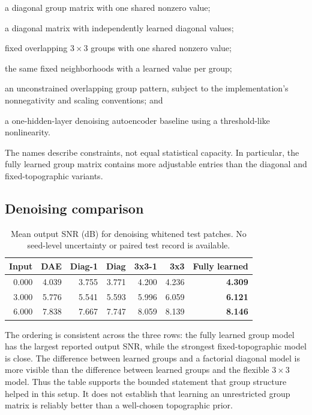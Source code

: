 \begin{description}[style=nextline]
  \item[Diag-1] a diagonal group matrix with one shared nonzero value;
  \item[Diag] a diagonal matrix with independently learned diagonal values;
  \item[3x3-1] fixed overlapping $3\times3$ groups with one shared nonzero value;
  \item[3x3] the same fixed neighborhoods with a learned value per group;
  \item[Fully learned] an unconstrained overlapping group pattern, subject to the implementation's nonnegativity and scaling conventions; and
  \item[DAE] a one-hidden-layer denoising autoencoder baseline using a threshold-like nonlinearity.
\end{description}

The names describe constraints, not equal statistical capacity. In particular, the fully learned group matrix contains more adjustable entries than the diagonal and fixed-topographic variants.

\subsection{Denoising comparison}

\begin{table}[htbp]
\centering
\caption[Patch denoising SNR]{Mean output SNR (dB) for denoising whitened test patches. No seed-level uncertainty or paired test record is available.}
\label{tab:denoising-results}
\begin{tabular}{@{}rrrrrrr@{}}
\toprule
Input & DAE & Diag-1 & Diag & 3x3-1 & 3x3 & Fully learned \\
\midrule
0.000 & 4.039 & 3.755 & 3.771 & 4.200 & 4.236 & \textbf{4.309} \\
3.000 & 5.776 & 5.541 & 5.593 & 5.996 & 6.059 & \textbf{6.121} \\
6.000 & 7.838 & 7.667 & 7.747 & 8.059 & 8.139 & \textbf{8.146} \\
\bottomrule
\end{tabular}
\end{table}

The ordering is consistent across the three rows: the fully learned group model has the largest reported output SNR, while the strongest fixed-topographic model is close. The difference between learned groups and a factorial diagonal model is more visible than the difference between learned groups and the flexible $3\times3$ model. Thus the table supports the bounded statement that group structure helped in this setup. It does not establish that learning an unrestricted group matrix is reliably better than a well-chosen topographic prior.

